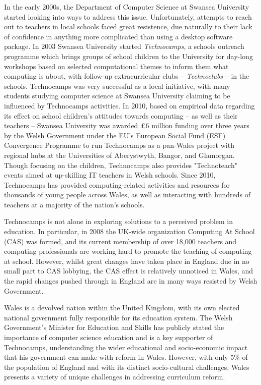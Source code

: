 \documentclass{sig-alternate}
\begin{document}
In the early 2000s, the Department of Computer Science at Swansea University
started looking into ways to address this issue.
Unfortunately, attempts to reach out to teachers in local schools
faced great resistence, due naturally to their lack of confidence
in anything more complicated than using a desktop software package.
In 2003 Swansea University
started \emph{Technocamps}, a schools outreach programme which brings groups
of school children to the University for day-long workshops based on
selected computational themes to inform them what computing is about,
with follow-up extracurricular clubs -- \emph{Technoclubs} --  in the
schools.
Technocamps was very successful as a local initiative, with many
students studying computer science at Swansea University claiming to be
influenced by Technocamps activities. In 2010, based on empirical data
regarding its effect on school children's attitudes towards computing
-- as well as their teachers -- Swansea University was awarded
\pounds 6 million funding over three years
by the Welsh Government under the EU's European Social
Fund (ESF) Convergence Programme to run Technocamps as a pan-Wales
project with regional hubs
at the Universities of Aberystwyth, Bangor, and Glamorgan.
Though focusing on the children, Technocamps also provides "Technoteach"
events aimed at up-skilling IT teachers in Welsh schools. Since 2010,
Technocamps has provided computing-related activities and resources
for thousands of young people across Wales, as well as interacting
with hundreds of teachers at a majority of the nation's schools.

Technocamps is not alone in exploring solutions to a
perceived problem in education. In particular, in 2008 the UK-wide
organization Computing At School (CAS) was formed, and its current
membership of over 18,000 teachers and computing professionals are
working hard to promote the teaching of computing at school.
However, whilst great changes have taken place in England
due in no small part to CAS lobbying,
the CAS effect is relatively unnoticed in Wales,
and the rapid changes pushed through in England
are in many ways resisted by Welsh Government.

Wales is a devolved nation within the United Kingdom, with its own
elected national government fully responsible for its education
system. The Welsh Government's Minister for Education and Skills has
publicly stated the importance of computer science education and is a
key supporter of Technocamps, understanding the wider educational and
socio-economic impact that his government can make with reform in Wales.
However, with only 5\% of the population of England and with its distinct
socio-cultural challenges, Wales presents a variety of unique challenges
in addressing curriculum reform.
\end{document}
